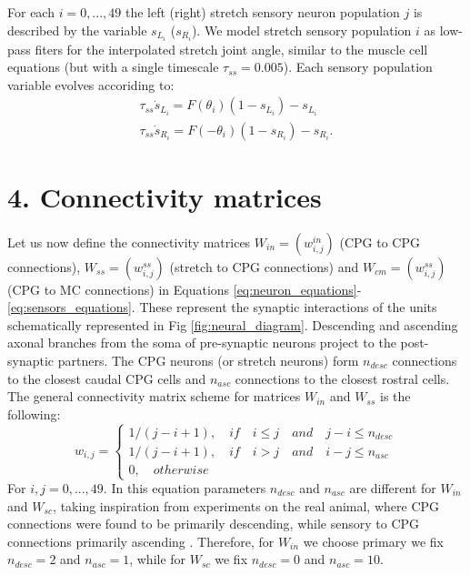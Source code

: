 \documentclass{cmc}
\begin{document}
For each $i=0,...,49$ the left (right) stretch sensory neuron population $j$ is described by the variable $s_{L_i}$ ($s_{R_i}$). We model stretch sensory population $i$ as low-pass fiters for the interpolated stretch joint angle, similar to the muscle cell equations (but with a single timescale $\tau_{ss}=0.005$). Each sensory population variable evolves accoriding to:
\begin{equation}
    \begin{array}{lcl}
	\tau_{ss} \dot{s}_{L_i} = F(\theta_i) (1-s_{L_i}) - s_{L_i}\\
	\tau_{ss} \dot{s}_{R_i} = F(-\theta_i) (1-s_{R_i}) - s_{R_i}.
    \end{array}
	\label{eq:sensors_equations}
\end{equation}

\section*{4. Connectivity matrices}
Let us now define the connectivity matrices $W_{in}=(w^{in}_{i,j})$ (CPG to CPG connections), $W_{ss}=(w^{ss}_{i,j})$ (stretch to CPG connections) and $W_{cm}=(w^{ss}_{i,j})$ (CPG to MC connections) in Equations \ref{eq:neuron_equations}-\ref{eq:sensors_equations}. These represent the synaptic interactions of the units schematically represented in Fig \ref{fig:neural_diagram}. Descending and ascending axonal branches from the soma of pre-synaptic neurons project to the post-synaptic partners. The CPG neurons (or stretch neurons) form $n_{desc}$ connections to the closest caudal CPG cells and $n_{asc}$ connections to the closest rostral cells. The general connectivity matrix scheme for matrices $W_{in}$ and $W_{ss}$ is the following:
\begin{equation}
    w_{i,j} = \begin{cases}
      1/(j-i+1), \quad if \quad i \leq j \quad and \quad j-i \leq n_{desc}\\
      1/(j-i+1), \quad if \quad i>j \quad and \quad i-j \leq n_{asc}\\
      0, \quad otherwise
    \end{cases}
\end{equation}
For $i,j=0,...,49$. In this equation parameters $n_{desc}$ and $n_{asc}$ are different for $W_{in}$ and $W_{sc}$, taking inspiration from experiments on the real animal, where CPG connections were found to be primarily descending, while sensory to CPG connections primarily ascending \cite{picton_developmental_2022, picton_spinal_2021}. Therefore, for $W_{in}$ we choose primary we fix $n_{desc}=2$ and $n_{asc}=1$, while for $W_{sc}$ we fix $n_{desc}=0$ and $n_{asc}=10$.
\end{document}

